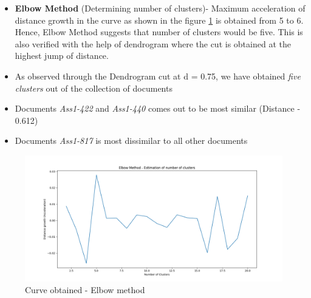 \documentclass[7pt,a4paper]{article}
\begin{document}
\begin{itemize}
\item{\textbf{Elbow Method} (Determining number of clusters)- Maximum acceleration of distance growth in the curve as shown in the figure \ref{image-elbow-method} is obtained from 5 to 6. Hence, Elbow Method suggests that number of clusters would be five. This is also verified with the help of dendrogram where the cut is obtained at the highest jump of distance.}
\item{As observed through the Dendrogram cut at d = 0.75, we have obtained \textit{five clusters} out of the collection of documents}
\item{Documents \textit{Ass1-422} and \textit{Ass1-440} comes out to be most similar (Distance - 0.612)}
\item{Documents \textit{Ass1-817} is most dissimilar to all other documents}
\end{itemize}

\begin{figure}[h]
\centering
\includegraphics[scale=.30]{elbow}
\caption{Curve obtained - Elbow method}
\label{image-elbow-method}
\end{figure}
\end{document}
